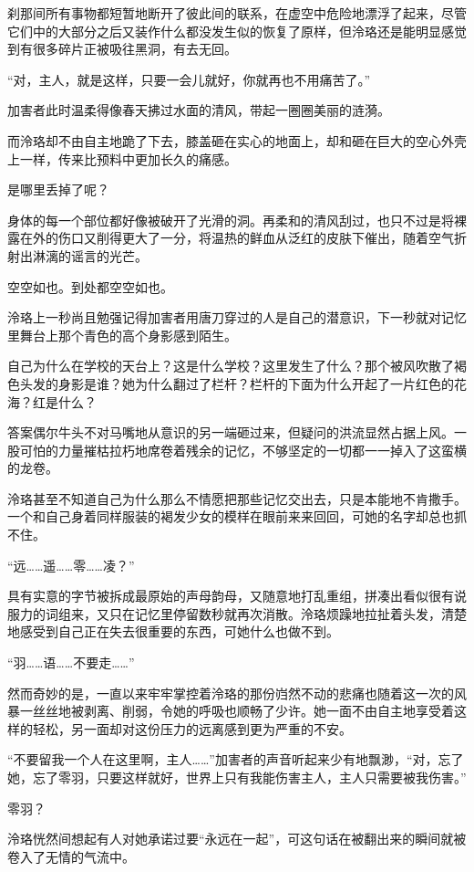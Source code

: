 \documentclass[UTF8, scheme = chinese, openany]{ctexbook}
\begin{document}
刹那间所有事物都短暂地断开了彼此间的联系，在虚空中危险地漂浮了起来，尽管它们中的大部分之后又装作什么都没发生似的恢复了原样，但泠珞还是能明显感觉到有很多碎片正被吸往黑洞，有去无回。

“对，主人，就是这样，只要一会儿就好，你就再也不用痛苦了。”

加害者此时温柔得像春天拂过水面的清风，带起一圈圈美丽的涟漪。

而泠珞却不由自主地跪了下去，膝盖砸在实心的地面上，却和砸在巨大的空心外壳上一样，传来比预料中更加长久的痛感。

是哪里丢掉了呢？

身体的每一个部位都好像被破开了光滑的洞。再柔和的清风刮过，也只不过是将裸露在外的伤口又削得更大了一分，将温热的鲜血从泛红的皮肤下催出，随着空气折射出淋漓的谣言的光芒。

空空如也。到处都空空如也。

泠珞上一秒尚且勉强记得加害者用唐刀穿过的人是自己的潜意识，下一秒就对记忆里舞台上那个青色的高个身影感到陌生。

自己为什么在学校的天台上？这是什么学校？这里发生了什么？那个被风吹散了褐色头发的身影是谁？她为什么翻过了栏杆？栏杆的下面为什么开起了一片红色的花海？红是什么？

答案偶尔牛头不对马嘴地从意识的另一端砸过来，但疑问的洪流显然占据上风。一股可怕的力量摧枯拉朽地席卷着残余的记忆，不够坚定的一切都一一掉入了这蛮横的龙卷。

泠珞甚至不知道自己为什么那么不情愿把那些记忆交出去，只是本能地不肯撒手。一个和自己身着同样服装的褐发少女的模样在眼前来来回回，可她的名字却总也抓不住。

“远……遥……零……凌？”

具有实意的字节被拆成最原始的声母韵母，又随意地打乱重组，拼凑出看似很有说服力的词组来，又只在记忆里停留数秒就再次消散。泠珞烦躁地拉扯着头发，清楚地感受到自己正在失去很重要的东西，可她什么也做不到。

“羽……语……不要走……”

然而奇妙的是，一直以来牢牢掌控着泠珞的那份岿然不动的悲痛也随着这一次的风暴一丝丝地被剥离、削弱，令她的呼吸也顺畅了少许。她一面不由自主地享受着这样的轻松，另一面却对这份压力的远离感到更为严重的不安。

“不要留我一个人在这里啊，主人……”加害者的声音听起来少有地飘渺，“对，忘了她，忘了零羽，只要这样就好，世界上只有我能伤害主人，主人只需要被我伤害。”

零羽？

泠珞恍然间想起有人对她承诺过要“永远在一起”，可这句话在被翻出来的瞬间就被卷入了无情的气流中。
\end{document}
